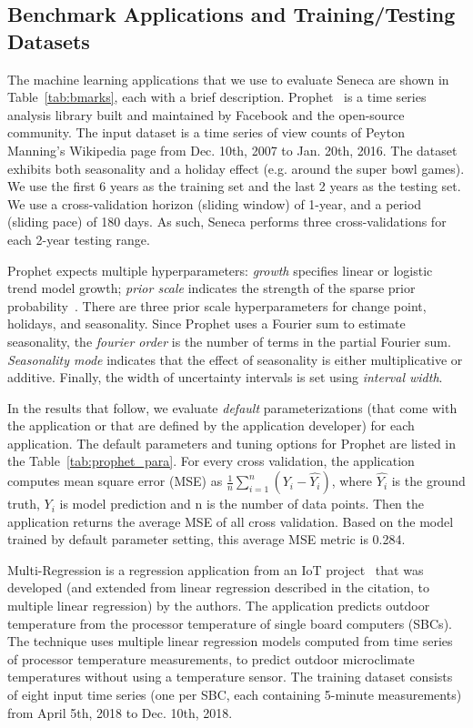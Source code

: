 \subsection{Benchmark Applications and Training/Testing  Datasets}
The machine learning applications that we use to evaluate Seneca 
are shown in Table~\ref{tab:bmarks}, each with 
a brief description.
Prophet~\cite{ref:prophet} is a time series analysis library built and maintained by Facebook and the open-source community. The input dataset is a time series of view counts
of Peyton Manning's Wikipedia page from Dec. 10th, 2007 to Jan. 20th, 2016. 
The dataset exhibits both seasonality and a holiday effect (e.g. around the super bowl games). 
We use the first 6 years as the training set and the last 2 years as the testing set.
We use a cross-validation horizon (sliding window) of 1-year, 
and a period (sliding pace) 
of 180 days.  As such, Seneca performs three cross-validations for each 2-year testing range.

Prophet expects multiple hyperparameters: \textit{growth} specifies linear or logistic trend model growth; \textit{prior scale} indicates the strength of the 
sparse prior probability~\cite{ref:sparse_prior}. 
There are three prior scale hyperparameters for change point, holidays, and seasonality. 
Since Prophet uses a Fourier sum to estimate seasonality, 
the \textit{fourier order} is the number of terms in the partial Fourier 
sum. \textit{Seasonality mode} indicates that the effect of seasonality is either 
multiplicative or additive. Finally, the width of uncertainty intervals 
is set using \textit{interval width}.

In the results that follow, we evaluate \textit{default} parameterizations (that come with 
the application or that are defined by the application developer) for each application.  
The default parameters and tuning options for Prophet are listed in the Table~\ref{tab:prophet_para}. For every cross validation, the application computes mean square error (MSE) as $\frac{1}{n}\sum_{i=1}^{n}(Y_i - \hat{Y_i})$, where $\hat{Y_i}$ is the ground truth, $Y_i$ is model prediction and n is the number of data points. Then the application returns the average MSE of all cross validation. Based on the model trained by default parameter setting, this average MSE metric is 0.284.


Multi-Regression is a regression application 
from an IoT project~\cite{iot-cpu} that was developed (and extended
from linear regression described in the citation, 
to multiple linear regression) by the authors.
The application predicts outdoor temperature from the processor 
temperature of single board computers (SBCs).  
The technique uses multiple linear regression models computed from time
series of processor temperature measurements,
to predict outdoor microclimate temperatures without using a temperature sensor.
The training dataset consists of eight input time series (one per SBC, each containing 
5-minute measurements) from April 5th, 2018 to Dec. 10th, 2018.

